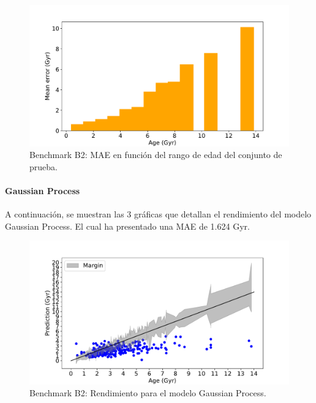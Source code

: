 \begin{figure}[H]
\begin{center}
 \includegraphics[width=0.8\linewidth]{Figuras/Experimentos/B_B2_nnet_3.pdf}
\end{center}
\caption{Benchmark B2: MAE en función del rango de edad del conjunto de prueba.}
 \label{fig:benchB2_details_nnet_3}
\end{figure}

\paragraph{Gaussian Process} 
A continuación, se muestran las 3 gráficas que detallan el rendimiento del modelo Gaussian Process. El cual ha presentado una MAE de 1.624 Gyr.

\begin{figure}[H]
\begin{center}
 \includegraphics[width=0.8\linewidth]{Figuras/Experimentos/B_B2_gp_1.pdf}
\end{center}
\caption{Benchmark B2: Rendimiento para el modelo Gaussian Process.}
 \label{fig:benchB2_details_gp_1}
\end{figure}

